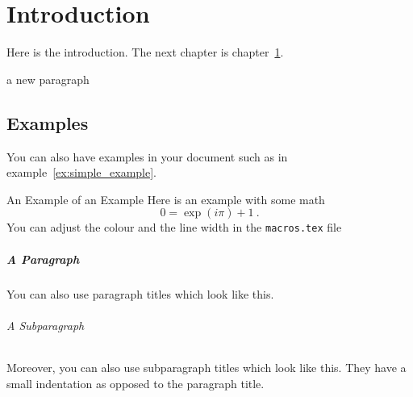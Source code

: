 \chapter{Introduction}\label{ch:introduction}
Here is the introduction. The next chapter is chapter~\ref{ch:introduction}.

a new paragraph

\section{Examples}
You can also have examples in your document such as in example~\ref{ex:simple_example}.
\begin{example}{An Example of an Example}
  \label{ex:simple_example}
  Here is an example with some math
  \begin{equation}
    0 = \exp(i\pi)+1\ .
  \end{equation}
  You can adjust the colour and the line width in the {\tt macros.tex} file 
\end{example}

\paragraph{A Paragraph}
You can also use paragraph titles which look like this.
\subparagraph{A Subparagraph} Moreover, you can also use subparagraph titles which look like this. They have a small indentation as opposed to the paragraph title.

